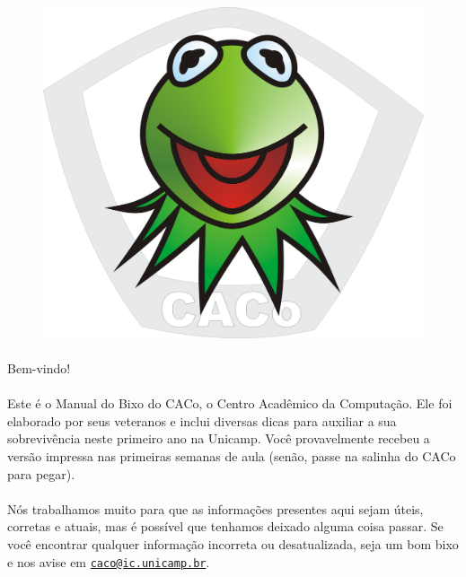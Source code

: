\documentclass[a4paper,10pt, twocolumn, twoside, titlepage]{article}
\newcommand{\email}[1]{\href{mailto:#1}{\nolinkurl{#1}}}
\begin{document}
\thispagestyle{empty}

\hfill
\pagebreak[4]


\onecolumn
{}

\begin{figure}[H]
    \centering
    \includegraphics[scale=0.45,keepaspectratio=true]{img/caco-logo-grande.png}
\end{figure}

\paragraph{}
Bem-vindo!

\paragraph{}
Este é o Manual do Bixo do CACo, o Centro Acadêmico da Computação.
Ele foi elaborado por seus veteranos e inclui diversas dicas para auxiliar a sua
sobrevivência neste primeiro ano na Unicamp.
Você provavelmente recebeu a versão impressa nas primeiras semanas de aula (senão, passe na salinha do CACo para pegar).

\paragraph{}
Nós trabalhamos muito para que as informações presentes aqui sejam úteis,
corretas e atuais, mas é possível que tenhamos deixado alguma coisa passar. Se
você encontrar qualquer informação incorreta ou desatualizada, seja um bom bixo
e nos avise em \email{caco@ic.unicamp.br}.
\end{document}
